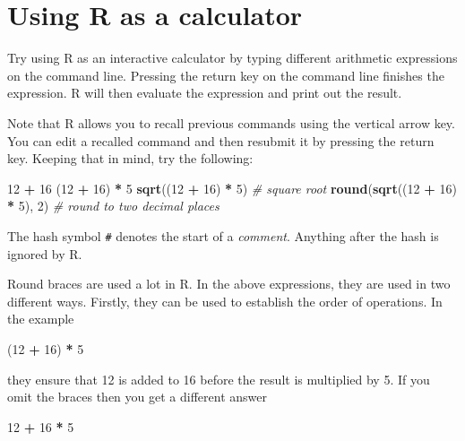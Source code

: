 \documentclass[
]{book}
\newenvironment{Shaded}{\begin{snugshade}}{\end{snugshade}}
\newcommand{\CommentTok}[1]{\textcolor[rgb]{0.56,0.35,0.01}{\textit{#1}}}
\newcommand{\DecValTok}[1]{\textcolor[rgb]{0.00,0.00,0.81}{#1}}
\newcommand{\FunctionTok}[1]{\textcolor[rgb]{0.13,0.29,0.53}{\textbf{#1}}}
\newcommand{\NormalTok}[1]{#1}
\newcommand{\SpecialCharTok}[1]{\textcolor[rgb]{0.81,0.36,0.00}{\textbf{#1}}}
\begin{document}
\section{Using R as a calculator}\label{using-r-as-a-calculator}

Try using R as an interactive calculator by typing different
arithmetic expressions on the command line. Pressing the return key
on the command line finishes the expression. R will then evaluate the
expression and print out the result.

Note that R allows you to recall previous commands using the vertical
arrow key. You can edit a recalled command and then resubmit it by
pressing the return key. Keeping that in mind, try the following:

\begin{Shaded}
\begin{Highlighting}[]
\DecValTok{12} \SpecialCharTok{+} \DecValTok{16}
\NormalTok{(}\DecValTok{12} \SpecialCharTok{+} \DecValTok{16}\NormalTok{) }\SpecialCharTok{*} \DecValTok{5}
\FunctionTok{sqrt}\NormalTok{((}\DecValTok{12} \SpecialCharTok{+} \DecValTok{16}\NormalTok{) }\SpecialCharTok{*} \DecValTok{5}\NormalTok{) }\CommentTok{\# square root}
\FunctionTok{round}\NormalTok{(}\FunctionTok{sqrt}\NormalTok{((}\DecValTok{12} \SpecialCharTok{+} \DecValTok{16}\NormalTok{) }\SpecialCharTok{*} \DecValTok{5}\NormalTok{), }\DecValTok{2}\NormalTok{) }\CommentTok{\# round to two decimal places}
\end{Highlighting}
\end{Shaded}

The hash symbol \texttt{\#} denotes the start of a \emph{comment}.
Anything after the hash is ignored by R.

Round braces are used a lot in R. In the above expressions, they are
used in two different ways. Firstly, they can be used to establish the
order of operations. In the example

\begin{Shaded}
\begin{Highlighting}[]
\NormalTok{(}\DecValTok{12} \SpecialCharTok{+} \DecValTok{16}\NormalTok{) }\SpecialCharTok{*} \DecValTok{5}
\end{Highlighting}
\end{Shaded}

they ensure that 12 is added to 16 before the result is multiplied by 5.
If you omit the braces then you get a different answer

\begin{Shaded}
\begin{Highlighting}[]
\DecValTok{12} \SpecialCharTok{+} \DecValTok{16} \SpecialCharTok{*} \DecValTok{5}
\end{Highlighting}
\end{Shaded}
\end{document}
